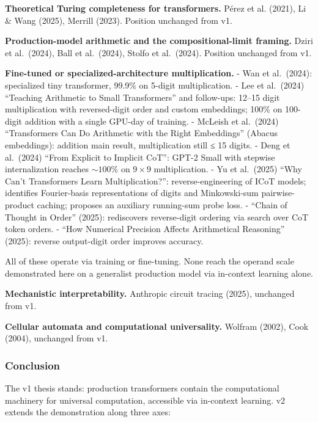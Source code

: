 \documentclass[twocolumn,switch,10pt]{article}
\begin{document}
\textbf{Theoretical Turing completeness for transformers.} Pérez et al.
(2021), Li \& Wang (2025), Merrill (2023). Position unchanged from
v1.

\textbf{Production-model arithmetic and the compositional-limit framing.}
Dziri et al.~(2024), Ball et al.~(2024), Stolfo et al.~(2024).
Position unchanged from v1.

\textbf{Fine-tuned or specialized-architecture multiplication.}
- Wan et al.~(2024): specialized tiny transformer, 99.9\% on 5-digit
multiplication.
- Lee et al.~(2024) ``Teaching Arithmetic to Small Transformers'' and
follow-ups: 12--15 digit multiplication with reversed-digit order
and custom embeddings; 100\% on 100-digit addition with a single
GPU-day of training.
- McLeish et al.~(2024) ``Transformers Can Do Arithmetic with the
Right Embeddings'' (Abacus embeddings): addition main result,
multiplication still ≤ 15 digits.
- Deng et al.~(2024) ``From Explicit to Implicit CoT'': GPT-2 Small
with stepwise internalization reaches \(\sim 100\%\) on \(9 \times 9\)
multiplication.
- Yu et al.~(2025) ``Why Can't Transformers Learn Multiplication?'':
reverse-engineering of ICoT models; identifies Fourier-basis
representations of digits and Minkowski-sum pairwise-product
caching; proposes an auxiliary running-sum probe loss.
- ``Chain of Thought in Order'' (2025): rediscovers reverse-digit
ordering via search over CoT token orders.
- ``How Numerical Precision Affects Arithmetical Reasoning'' (2025):
reverse output-digit order improves accuracy.

All of these operate via training or fine-tuning. None reach the
operand scale demonstrated here on a generalist production model
via in-context learning alone.

\textbf{Mechanistic interpretability.} Anthropic circuit tracing (2025),
unchanged from v1.

\textbf{Cellular automata and computational universality.} Wolfram
(2002), Cook (2004), unchanged from v1.

\subsubsection{Conclusion}\label{conclusion}

The v1 thesis stands: production transformers contain the
computational machinery for universal computation, accessible via
in-context learning. v2 extends the demonstration along three axes:
\end{document}
